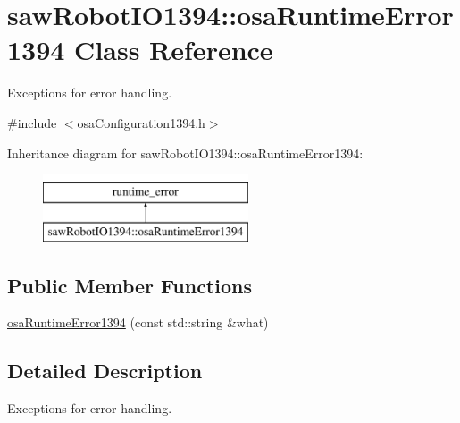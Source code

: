 \hypertarget{classsaw_robot_i_o1394_1_1osa_runtime_error1394}{\section{saw\-Robot\-I\-O1394\-:\-:osa\-Runtime\-Error1394 Class Reference}
\label{classsaw_robot_i_o1394_1_1osa_runtime_error1394}
}


Exceptions for error handling.  




{\ttfamily \#include $<$osa\-Configuration1394.\-h$>$}

Inheritance diagram for saw\-Robot\-I\-O1394\-:\-:osa\-Runtime\-Error1394\-:\begin{figure}[H]
\begin{center}
\leavevmode
\includegraphics[height=2.000000cm]{d8/da1/classsaw_robot_i_o1394_1_1osa_runtime_error1394}
\end{center}
\end{figure}
\subsection*{Public Member Functions}
\begin{DoxyCompactItemize}
\item 
\hyperlink{classsaw_robot_i_o1394_1_1osa_runtime_error1394_a41ff359fbdfea2232d37a48560e98a5c}{osa\-Runtime\-Error1394} (const std\-::string \&what)
\end{DoxyCompactItemize}


\subsection{Detailed Description}
Exceptions for error handling. 

